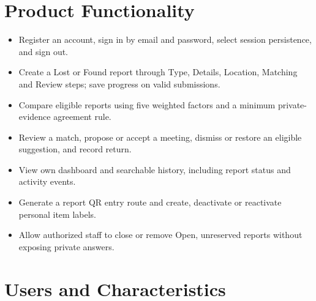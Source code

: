 \documentclass[12pt,a4paper,oneside]{report}
\begin{document}

\section{Product Functionality}

\begin{itemize}

\item Register an account, sign in by email and password, select session persistence, and sign out.

\item Create a Lost or Found report through Type, Details, Location, Matching and Review steps; save progress on valid submissions.

\item Compare eligible reports using five weighted factors and a minimum private-evidence agreement rule.

\item Review a match, propose or accept a meeting, dismiss or restore an eligible suggestion, and record return.

\item View own dashboard and searchable history, including report status and activity events.

\item Generate a report QR entry route and create, deactivate or reactivate personal item labels.

\item Allow authorized staff to close or remove Open, unreserved reports without exposing private answers.

\end{itemize}


\section{Users and Characteristics}
\end{document}
